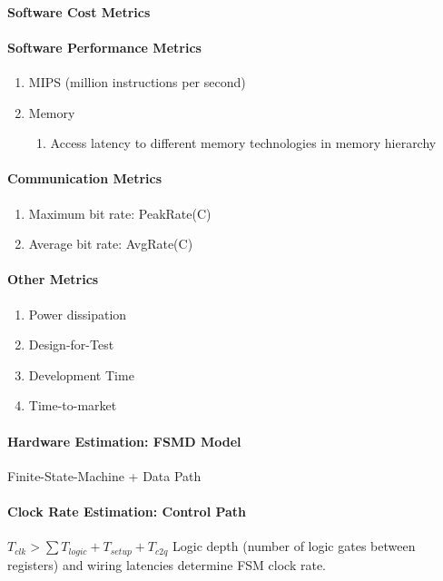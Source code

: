 \documentclass[english]{latex4ei/latex4ei_sheet}
\begin{document}
\paragraph{Software Cost Metrics}

\paragraph{Software Performance Metrics}
\begin{enumerate}
	\item MIPS (million instructions per second)
	\item Memory
	  \begin{enumerate}
	  	\item Access latency to different memory technologies in memory hierarchy
	  \end{enumerate}
\end{enumerate}

\paragraph{Communication Metrics}
\begin{enumerate}
	\item Maximum bit rate: PeakRate(C)
	\item Average bit rate: AvgRate(C)
\end{enumerate}

\paragraph{Other Metrics}
\begin{enumerate}
	\item Power dissipation
	\item Design-for-Test
	\item Development Time
	\item Time-to-market
\end{enumerate}

\paragraph{Hardware Estimation: FSMD Model}
Finite-State-Machine + Data Path

\paragraph{Clock Rate Estimation: Control Path}
$T_{clk} > \sum T_{logic} + T_{setup} + T_{c2q}$
Logic depth (number of logic gates between registers) and wiring latencies determine FSM clock rate.
\end{document}
